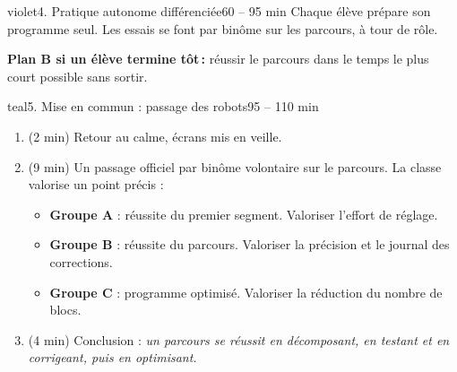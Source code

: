 \documentclass[11pt,a4paper]{article}
\begin{document}
\begin{etape}{violet}{4. Pratique autonome différenciée}{60 -- 95 min}
Chaque élève prépare son programme seul. Les essais se font par binôme sur les parcours, à tour de rôle.

\medskip
{}

\medskip
\textbf{Plan B si un élève termine tôt\,:} réussir le parcours dans le temps le plus court possible sans sortir.
\end{etape}

\begin{etape}{teal}{5. Mise en commun : passage des robots}{95 -- 110 min}
\begin{enumerate}
 \item (2 min) Retour au calme, écrans mis en veille.
 \item (9 min) Un passage officiel par binôme volontaire sur le parcours. La classe valorise un point précis :
 \begin{itemize}
  \item \textbf{Groupe A} : réussite du premier segment. Valoriser l'effort de réglage.
  \item \textbf{Groupe B} : réussite du parcours. Valoriser la précision et le journal des corrections.
  \item \textbf{Groupe C} : programme optimisé. Valoriser la réduction du nombre de blocs.
 \end{itemize}
 \item (4 min) Conclusion : \textit{un parcours se réussit en décomposant, en testant et en corrigeant, puis en optimisant.}
\end{enumerate}
\end{etape}


\newpage
\end{document}
